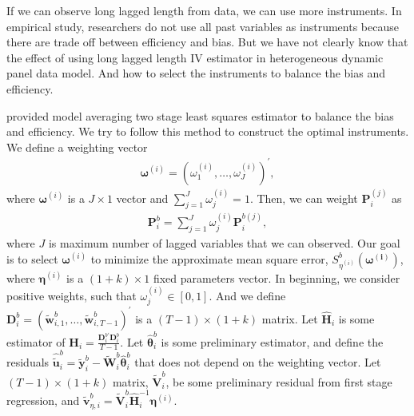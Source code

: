 \documentclass[12pt,a4paper,hyperref]{article}
\begin{document}
If we can observe long lagged length from data, we can use more instruments.
In empirical study, researchers do not use all past variables as instruments because there are trade off between efficiency and bias.
But we have not clearly know that the effect of using long lagged length  IV estimator in heterogeneous dynamic panel data model. And how to select the instruments to balance the bias and efficiency.

\citet{Kuersteiner:2010} provided model averaging two stage least squares estimator to balance the bias and efficiency. We try to follow this method to construct the optimal instruments. We define a weighting vector
\begin{align}
\boldsymbol{\omega}^{(i)}=\left(\omega^{(i)}_{1}, \ldots,\omega^{(i)}_{J}  \right)^{'},
\end{align}
where $\boldsymbol{\omega}^{(i)}$ is a $J \times 1$ vector and $\sum^{J}_{j=1} \omega^{(i)}_{j}=1.$
Then, we can weight $\boldsymbol{P}^{(j)}_{i}$ as
\begin{align}
\boldsymbol{P}^{b}_{i}= \sum^{J}_{j=1} \omega^{(i)}_{j} \boldsymbol{P}^{b(j)}_{i},
\end{align}
where $J$ is maximum number of lagged variables that we can observed.
Our goal is to select $\boldsymbol{\omega}^{(i)}$ to minimize the approximate mean square error, $S^{b}_{\eta^{(i)}}\left(\boldsymbol{\omega^{(i)}} \right)$, where $\boldsymbol{\eta}^{(i)}$ is a $(1+k) \times 1$ fixed parameters vector.
 In beginning, we consider positive weights, such that $\omega^{(i)}_{j} \in [0,1].$ And we define $\boldsymbol{D}^{b}_{i}=\left( \tilde{\boldsymbol{w}}^{b}_{i,1},\ldots,  \tilde{\boldsymbol{w}}^{b}_{i,T-1} \right)^{'}$ is a $(T-1) \times (1+k)$ matrix. Let $\hat{\boldsymbol{H}}_{i}$ is some estimator of $\boldsymbol{H}_{i}=\frac{\boldsymbol{D}^{b'}_{i}\boldsymbol{D}^{b}_{i}}{T-1}$. Let $\hat{\boldsymbol{\theta}}^{b}_{i}$ is some preliminary estimator, and define the residuals $\hat{\tilde{\boldsymbol{u}}}^{b}_{i}=\tilde{\boldsymbol{y}}^{b}_{i}-\tilde{\boldsymbol{W}}^{b}_{i}\hat{\boldsymbol{\theta}}^{b}_{i}$ that does not depend on the weighting vector.  Let $(T-1) \times (1+k)$ matrix, $\tilde{\boldsymbol{V}}^{b}_{i}$, be some preliminary residual from first stage regression, and $\tilde{\boldsymbol{v}}^{b}_{\eta, i}=\tilde{\boldsymbol{V}}^{b}_{i} \hat{\boldsymbol{H}}_{i}^{-1}\boldsymbol{\eta}^{(i)}$.
\end{document}
